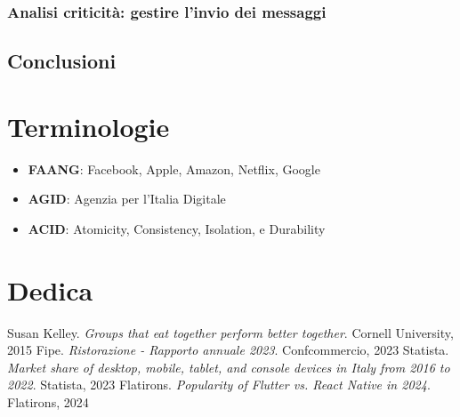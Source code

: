 \documentclass[a4paper, titlepage, 12pt, openright, twoside]{book}
\begin{document}
\subsection{Analisi criticità: gestire l'invio dei messaggi}

\section{Conclusioni}

\chapter{Terminologie}\label{chap:terminologie}

\begin{itemize}
	\item \textbf{FAANG}: Facebook, Apple, Amazon, Netflix, Google
	\item \textbf{AGID}: Agenzia per l'Italia Digitale
	\item \textbf{ACID}: Atomicity, Consistency, Isolation, e Durability
\end{itemize}

\chapter{Dedica}\label{chap:dedica}

\begin{thebibliography}{9}
	 Susan Kelley. \textsl{Groups that eat together perform better together}. Cornell University, 2015
	 Fipe. \textsl{Ristorazione - Rapporto annuale 2023}. Confcommercio, 2023
	 Statista. \textsl{Market share of desktop, mobile, tablet, and console devices in Italy from 2016 to 2022}. Statista, 2023
	 Flatirons. \textsl{Popularity of Flutter vs. React Native in 2024}. Flatirons, 2024
\end{thebibliography}
\end{document}
